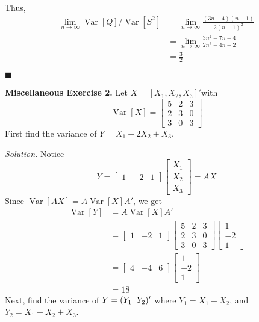 \documentclass{article}
\newcommand{\Var}{\operatorname{Var}} %
\begin{document}
Thus, 
\begin{align*}
\lim_{n\rightarrow \infty} \Var[Q]/\Var[S^2] &= \lim_{n\rightarrow \infty} \frac{(3n-4)(n-1)  }{2(n-1)^2}\\
&= \lim_{n\rightarrow \infty} \frac{ 3n^2-7n+4 }{2n^2-4n+2}\\
&= \frac32
\end{align*}
\begin{flushright}
\(\blacksquare\) 
\end{flushright}

\newpage
\textbf{Miscellaneous Exercise 2. } 
Let \(X = [X_1, X_2, X_3]' \)with
\[
\Var[X] = \begin{bmatrix}
5&2&3\\
2&3&0\\
3&0&3
\end{bmatrix}
\]
First find the variance of \( Y= X_1-2X_2+X_3\). 


\textit{Solution.} Notice \[
Y=\begin{bmatrix}
1&-2& 1
\end{bmatrix}
\begin{bmatrix}
X_1\\
X_2\\
X_3
\end{bmatrix}
= AX
\]
Since \(\Var[AX] = A\Var[X]A'\), we get
\begin{align*}
\Var[Y] &=  A\Var[X]A'\\
&= \begin{bmatrix}
1&-2& 1
\end{bmatrix}
\begin{bmatrix}
5&2&3\\
2&3&0\\
3&0&3
\end{bmatrix}\begin{bmatrix}
1\\
-2\\
1
\end{bmatrix} \\ 
&= \begin{bmatrix}
4 & -4 & 6 
\end{bmatrix}\begin{bmatrix}
1\\-2\\1
\end{bmatrix}\\
&=18
\end{align*}
Next, find the variance of \(Y = (Y_1 \hspace{2mm}  Y_2)'\) where \(Y_1= X_1+X_2\), and \(Y_2 = X_1+X_2+X_3\). 
\end{document}
